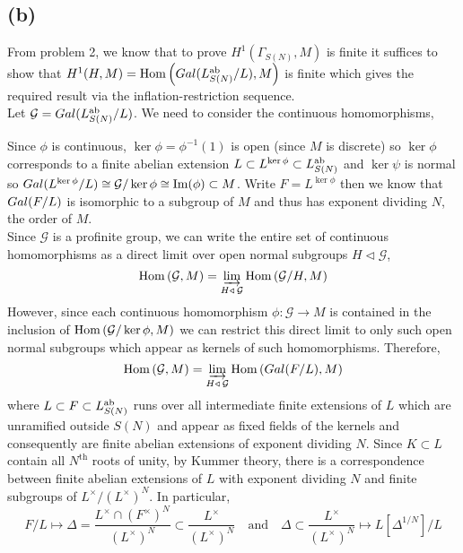 \documentclass[12pt]{extarticle}
\begin{document}
\subsection*{(b)}

From problem 2, we know that to prove $H^1(\Gamma_{S(N)}, M)$ is finite it suffices to show that $H^1(H, M) = \mathrm{Hom}\left(Gal \small(L^{\mathrm{ab}}_{S(N)} / L \small), M\right)$ is finite which gives the required result via the inflation-restriction sequence.
\bigskip\\
Let $\mathcal{G} = Gal \small(L^{\mathrm{ab}}_{S(N)} / L \small)$. We need to consider the continuous homomorphisms,
\begin{center}
\end{center}
Since $\phi$ is continuous, $\ker{\phi} = \phi^{-1}(1)$ is open (since $M$ is discrete) so $\ker{\phi}$ corresponds to a finite abelian extension $L \subset L^{\ker{\phi}} \subset L^{\mathrm{ab}}_{S(N)}$ and $\ker{\psi}$ is normal so $Gal \small(L^{\ker{\phi}} / L \small) \cong \mathcal{G} / \ker{\phi} \cong \mathrm{Im}(\phi) \subset M$. Write $F = L^{\ker{\phi}}$ then we know that $Gal \small(F/L \small)$ is isomorphic to a subgroup of $M$ and thus has exponent dividing $N$, the order of $M$.
\bigskip\\
Since $\mathcal{G}$ is a profinite group, we can write the entire set of continuous homomorphisms as a direct limit over open normal subgroups $H \triangleleft \mathcal{G}$,
\[ \mathrm{Hom}\left(\mathcal{G}, M\right) = \varinjlim_{H \triangleleft \: \mathcal{G}} \mathrm{Hom}\left( \mathcal{G} / H, M\right) \] 
However, since each continuous homomorphism $\phi : \mathcal{G} \to M$ is contained in the inclusion of $\mathrm{Hom}\left(\mathcal{G} / \ker{\phi}, M\right)$ we can restrict this direct limit to only such open normal subgroups which appear as kernels of such homomorphisms. Therefore,
\[ \mathrm{Hom}\left(\mathcal{G}, M\right) = \varinjlim_{H \triangleleft \: \mathcal{G}} \mathrm{Hom}\left( Gal \small(F / L \small) , M\right) \]
where $L \subset F \subset L^{\mathrm{ab}}_{S(N)}$ runs over all intermediate finite extensions of $L$ which are unramified outside $S(N)$ and appear as fixed fields of the kernels and consequently are finite abelian extensions of exponent dividing $N$. Since $K \subset L$ contain all $N^{\mathrm{th}}$ roots of unity, by Kummer theory, there is a correspondence between finite abelian extensions of $L$ with exponent dividing $N$ and finite subgroups of $L^\times / (L^\times)^N$. In particular,
\[ F / L \mapsto \Delta = \frac{L^\times \cap (F^\times)^N}{(L^\times)^{N}} \subset \frac{L^\times}{(L^\times)^N} \quad \text{and} \quad \Delta \subset \frac{L^\times}{(L^\times)^N} \mapsto L[\Delta^{1/N}] / L \]
\end{document}
